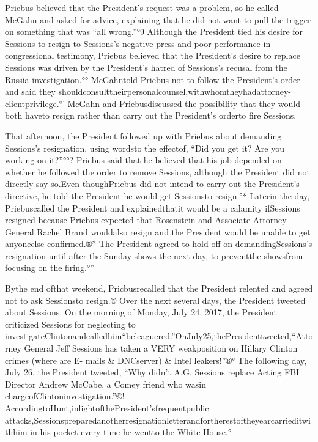 {Priebus believed that the President’s request was a problem, so he called McGahn and asked for advice, explaining that he did not want to pull the trigger on something that was “all wrong.”°9 Although the President tied his desire for Sessions to resign to Sessions’s negative press and poor performance in congressional testimony, Priebus believed that the President’s desire to replace Sessions was driven by the President’s hatred of Sessions’s recusal from the Russia investigation.°° McGahntold Priebus not to follow the President’s order and said they shouldconsulttheirpersonalcounsel,withwhomtheyhadattorney-clientprivilege.°' McGahn and Priebusdiscussed the possibility that they would both haveto resign rather than carry out the President’s orderto fire Sessions.

That afternoon, the President followed up with Priebus about demanding Sessions’s resignation, using wordsto the effectof, “Did you get it? Are you working on it?”°°? Priebus said that he believed that his job depended on whether he followed the order to remove Sessions, although the President did not directly say so.Even thoughPriebus did not intend to carry out the President’s directive, he told the President he would get Sessionsto resign.°* Laterin the day, Priebuscalled the President and explainedthatit would be a calamity ifSessions resigned because Priebus expected that Rosenstein and Associate Attorney General Rachel Brand wouldalso resign and the President would be unable to get anyoneelse confirmed.®* The President agreed to hold off on demandingSessions’s resignation until after the Sunday shows the next day, to preventthe showsfrom focusing on the firing.°”

Bythe end ofthat weekend, Pricbusrecalled that the President relented and agreed not to ask Sessionsto resign.® Over the next several days, the President tweeted about Sessions. On the morning of Monday, July 24, 2017, the President criticized Sessions for neglecting to investigateClintonandcalledhim“beleaguered.”OnJuly25,thePresidenttweeted,“Attorney General Jeff Sessions has taken a VERY weakposition on Hillary Clinton crimes (where are E- mails & DNCserver) & Intel leakers!”®° The following day, July 26, the President tweeted, “Why didn’t A.G. Sessions replace Acting FBI Director Andrew McCabe, a Comey friend who wasin chargeofClintoninvestigation.”©! AccordingtoHunt,inlightofthePresident’sfrequentpublic attacks,Sessionspreparedanotherresignationletterandfortherestoftheyearcarrieditwithhim in his pocket every time he wentto the White House.°

}
